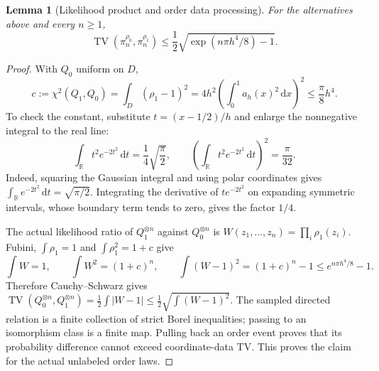 \documentclass[11pt]{article}
\newtheorem{lemma}[theorem]{Lemma}
\theoremstyle{remark}
\newcommand{\R}{\mathbb R}
\newcommand{\TV}{\operatorname{TV}}
\newcommand{\dd}{\,\mathrm d}
\begin{document}
\begin{lemma}[Likelihood product and order data processing]\label{lem:divergence}
For the alternatives above and every $n\ge1$,
\[
 \TV(\pi_n^{\rho_0},\pi_n^{\rho_1})
 \le\frac12\sqrt{\exp(n\pi h^4/8)-1}.
\]
\end{lemma}
\begin{proof}
With $Q_0$ uniform on $D$,
\[
 c:=\chi^2(Q_1,Q_0)
 =\int_D(\rho_1-1)^2
 =4h^2\left(\int_0^1 a_h(x)^2\dd x\right)^2
 \le\frac{\pi}{8}h^4.
\]
To check the constant, substitute $t=(x-1/2)/h$ and enlarge the
nonnegative integral to the real line:
\[
 \int_{\R}t^2e^{-2t^2}\dd t=\frac14\sqrt{\frac\pi2},
 \qquad
 \left(\int_{\R}t^2e^{-2t^2}\dd t\right)^2=\frac\pi{32}.
\]
Indeed, squaring the Gaussian integral and using polar coordinates
gives $\int_\R e^{-2t^2}\dd t=\sqrt{\pi/2}$.
Integrating the derivative of $te^{-2t^2}$ on expanding symmetric
intervals, whose boundary term tends to zero, gives the factor $1/4$.

The actual likelihood ratio of $Q_1^{\otimes n}$ against
$Q_0^{\otimes n}$ is $W(z_1,\ldots,z_n)=\prod_i\rho_1(z_i)$.
Fubini, $\int\rho_1=1$ and $\int\rho_1^2=1+c$ give
\[
 \int W=1,\qquad \int W^2=(1+c)^n,\qquad
 \int(W-1)^2=(1+c)^n-1\le e^{n\pi h^4/8}-1.
\]
Therefore Cauchy--Schwarz gives
$\TV(Q_0^{\otimes n},Q_1^{\otimes n})
=\frac12\int|W-1|\le\frac12\sqrt{\int(W-1)^2}$.
The sampled directed relation is a finite collection of strict Borel
inequalities; passing to an isomorphism class is a finite map.
Pulling back an order event proves that its probability difference
cannot exceed coordinate-data TV. This proves the claim for the
actual unlabeled order laws.
\end{proof}
\end{document}
